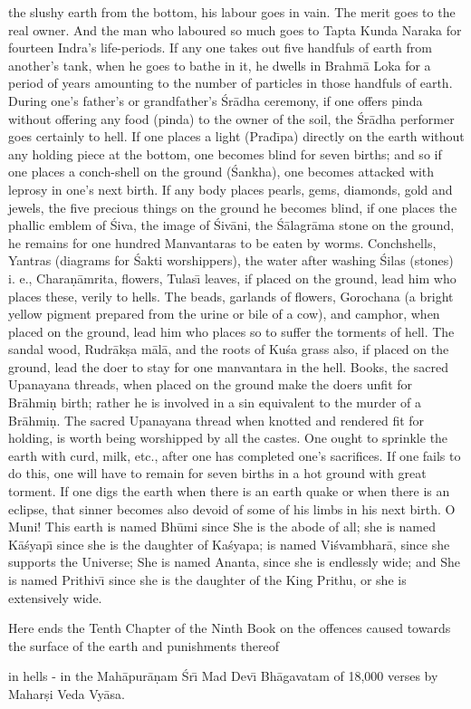 the slushy earth from the bottom, his labour goes in vain. The merit goes to the real owner. And the man who laboured so much goes to Tapta Kunda Naraka for fourteen Indra's life-periods. If any one takes out five handfuls of earth from another's tank, when he goes to bathe in it, he dwells in Brahm\=a Loka for a period of years amounting to the number of particles in those handfuls of earth. During one's father's or grandfather's \'Sr\=adha ceremony, if one offers pinda without offering any food (pinda) to the owner of the soil, the \'Sr\=adha performer goes certainly to hell. If one places a light (Prad\={\i}pa) directly on the earth without any holding piece at the bottom, one becomes blind for seven births; and so if one places a conch-shell on the ground (\'Sankha), one becomes attacked with leprosy in one's next birth. If any body places pearls, gems, diamonds, gold and jewels, the five precious things on the ground he becomes blind, if one places the phallic emblem of \'Siva, the image of \'Siv\=ani, the \'S\=alagr\=ama stone on the ground, he remains for one hundred Manvantaras to be eaten by worms. Conchshells, Yantras (diagrams for \'Sakti worshippers), the water after washing \'Silas (stones) i. e., Chara\d{n}\=amrita, flowers, Tulas\={\i} leaves, if placed on the ground, lead him who places these, verily to hells. The beads, garlands of flowers, Gorochana (a bright yellow pigment prepared from the urine or bile of a cow), and camphor, when placed on the ground, lead him who places so to suffer the torments of hell. The sandal wood, Rudr\=ak\d{s}a m\=al\=a, and the roots of Ku\'sa grass also, if placed on the ground, lead the doer to stay for one manvantara in the hell. Books, the sacred Upanayana threads, when placed on the ground make the doers unfit for Br\=ahmi\d{n} birth; rather he is involved in a sin equivalent to the murder of a Br\=ahmi\d{n}. The sacred Upanayana thread when knotted and rendered fit for holding, is worth being worshipped by all the castes. One ought to sprinkle the earth with curd, milk, etc., after one has completed one's sacrifices. If one fails to do this, one will have to remain for seven births in a hot ground with great torment. If one digs the earth when there is an earth quake or when there is an eclipse, that sinner becomes also devoid of some of his limbs in his next birth. O Muni! This earth is named Bh\=umi since She is the abode of all; she is named K\=a\'syap\={\i} since she is the daughter of Ka\'syapa; is named Vi\'svambhar\=a, since she supports the Universe; She is named Ananta, since she is endlessly wide; and She is named Prithiv\={\i} since she is the daughter of the King Prithu, or she is extensively wide.

Here ends the Tenth Chapter of the Ninth Book on the offences caused towards the surface of the earth and punishments thereof

in hells - in the Mah\=apur\=a\d{n}am \'Sr\={\i} Mad Dev\={\i} Bh\=agavatam of 18,000 verses by Mahar\d{s}i Veda Vy\=asa.



